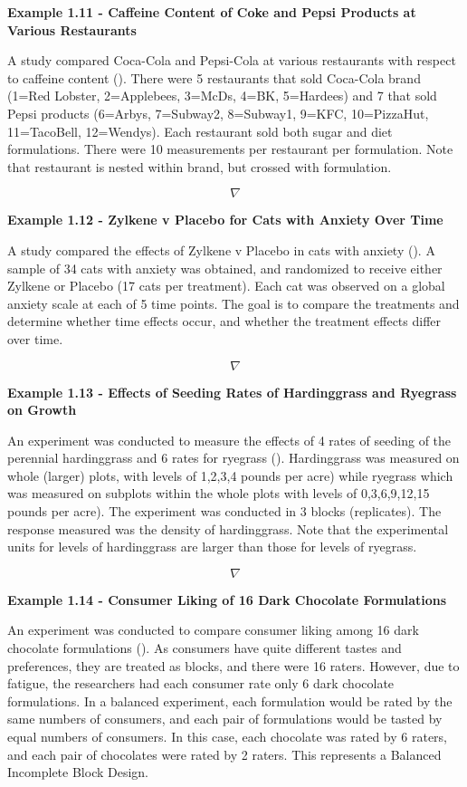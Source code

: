 \documentclass[
]{book}
\begin{document}
\textbf{Example 1.11 - Caffeine Content of Coke and Pepsi Products at
Various Restaurants}

A study compared Coca-Cola and Pepsi-Cola at various restaurants with
respect to caffeine content (). There were 5 restaurants that sold Coca-Cola brand (1=Red
Lobster, 2=Applebees, 3=McDs, 4=BK, 5=Hardees) and 7 that sold Pepsi
products (6=Arbys, 7=Subway2, 8=Subway1, 9=KFC, 10=PizzaHut,
11=TacoBell, 12=Wendys). Each restaurant sold both sugar and diet
formulations. There were 10 measurements per restaurant per formulation.
Note that restaurant is nested within brand, but crossed with
formulation.

\[\nabla\]

\textbf{Example 1.12 - Zylkene v Placebo for Cats with Anxiety Over
Time}

A study compared the effects of Zylkene v Placebo in cats with anxiety
(). A sample
of 34 cats with anxiety was obtained, and randomized to receive either
Zylkene or Placebo (17 cats per treatment). Each cat was observed on a
global anxiety scale at each of 5 time points. The goal is to compare
the treatments and determine whether time effects occur, and whether the
treatment effects differ over time.

\[\nabla\]

\textbf{Example 1.13 - Effects of Seeding Rates of Hardinggrass and
Ryegrass on Growth}

An experiment was conducted to measure the effects of 4 rates of seeding
of the perennial hardinggrass and 6 rates for ryegrass
(). Hardinggrass
was measured on whole (larger) plots, with levels of 1,2,3,4 pounds per
acre) while ryegrass which was measured on subplots within the whole
plots with levels of 0,3,6,9,12,15 pounds per acre). The experiment was
conducted in 3 blocks (replicates). The response measured was the
density of hardinggrass. Note that the experimental units for levels of
hardinggrass are larger than those for levels of ryegrass.

\[\nabla\]

\textbf{Example 1.14 - Consumer Liking of 16 Dark Chocolate
Formulations}

An experiment was conducted to compare consumer liking among 16 dark
chocolate formulations ().
As consumers have quite different tastes and preferences, they are
treated as blocks, and there were 16 raters. However, due to fatigue,
the researchers had each consumer rate only 6 dark chocolate
formulations. In a balanced experiment, each formulation would be rated
by the same numbers of consumers, and each pair of formulations would be
tasted by equal numbers of consumers. In this case, each chocolate was
rated by 6 raters, and each pair of chocolates were rated by 2 raters.
This represents a Balanced Incomplete Block Design.
\end{document}

